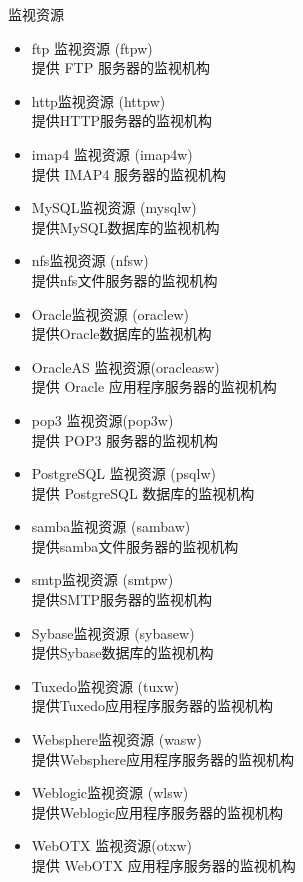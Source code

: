 \documentclass[compress,trans]{beamer} %
\begin{document}
\begin{frame}[allowframebreaks=.8,allowdisplaybreaks]{监视资源}
\begin{itemize}
	\item ftp 监视资源 (ftpw) \\ 提供 FTP 服务器的监视机构
	\item http监视资源 (httpw) \\ 提供HTTP服务器的监视机构
	\item imap4 监视资源 (imap4w) \\ 提供 IMAP4 服务器的监视机构
	\item MySQL监视资源 (mysqlw) \\ 提供MySQL数据库的监视机构
	\item nfs监视资源 (nfsw) \\ 提供nfs文件服务器的监视机构
	\item Oracle监视资源 (oraclew) \\ 提供Oracle数据库的监视机构
	\item OracleAS 监视资源(oracleasw) \\提供 Oracle 应用程序服务器的监视机构
	\item pop3 监视资源(pop3w) \\ 提供 POP3 服务器的监视机构
	\item PostgreSQL 监视资源 (psqlw) \\ 提供 PostgreSQL 数据库的监视机构
	\item samba监视资源 (sambaw) \\ 提供samba文件服务器的监视机构
	\item smtp监视资源 (smtpw) \\ 提供SMTP服务器的监视机构
	\item Sybase监视资源 (sybasew) \\ 提供Sybase数据库的监视机构
	\item Tuxedo监视资源 (tuxw) \\ 提供Tuxedo应用程序服务器的监视机构
	\item Websphere监视资源 (wasw) \\ 提供Websphere应用程序服务器的监视机构
	\item Weblogic监视资源 (wlsw) \\ 提供Weblogic应用程序服务器的监视机构
	\item WebOTX 监视资源(otxw) \\ 提供 WebOTX 应用程序服务器的监视机构
\end{itemize}
 \end{frame}
\end{document}
